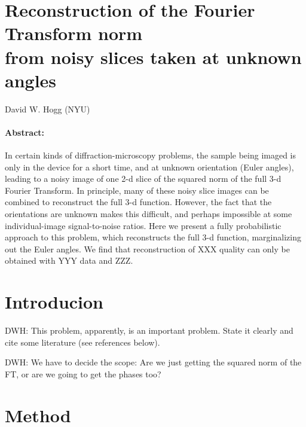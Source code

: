 \documentclass[12pt, letterpaper]{article}
\begin{document}
\section*{Reconstruction of the Fourier Transform norm \\
  from noisy slices taken at unknown angles}
\smallskip
\noindent
David W. Hogg (NYU)
\bigskip

\paragraph{Abstract:}
In certain kinds of diffraction-microscopy problems, the sample being
imaged is only in the device for a short time, and at unknown
orientation (Euler angles), leading to a noisy image of one 2-d slice
of the squared norm of the full 3-d Fourier Transform.
In principle, many of these noisy slice images can be combined to
reconstruct the full 3-d function.
However, the fact that the orientations are unknown makes this
difficult, and perhaps impossible at some individual-image
signal-to-noise ratios.
Here we present a fully probabilistic approach to this problem, which
reconstructs the full 3-d function, marginalizing out the Euler
angles.
We find that reconstruction of XXX quality can only be obtained with
YYY data and ZZZ.

\section{Introducion}

DWH: This problem, apparently, is an important problem.  State it clearly
and cite some literature (see references below).

DWH: We have to decide the scope: Are we just getting the squared norm of
the FT, or are we going to get the phases too?

\section{Method}
\end{document}
